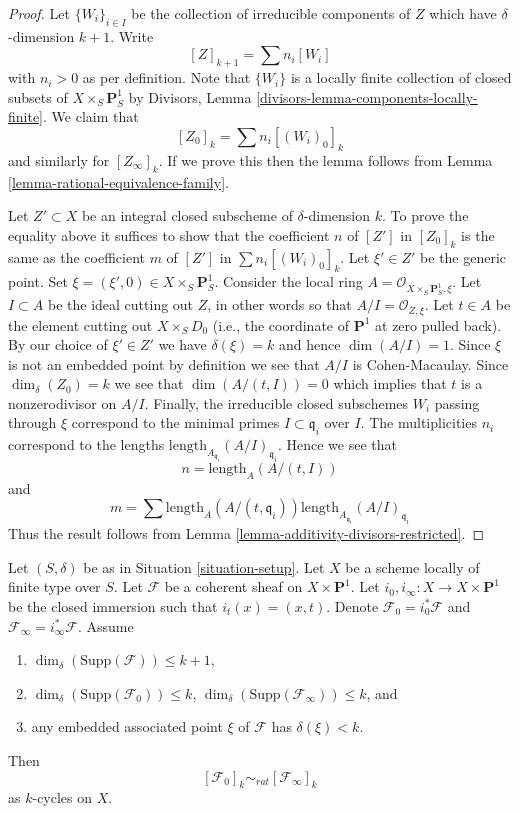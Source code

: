\begin{proof}
Let $\{W_i\}_{i \in I}$ be the collection of irreducible
components of $Z$ which have $\delta$-dimension $k + 1$.
Write
$$
[Z]_{k + 1} = \sum n_i[W_i]
$$
with $n_i > 0$ as per definition. Note that $\{W_i\}$
is a locally finite collection of closed subsets of
$X \times_S \mathbf{P}^1_S$ by
Divisors, Lemma \ref{divisors-lemma-components-locally-finite}.
We claim that
$$
[Z_0]_k = \sum n_i[(W_i)_0]_k
$$
and similarly for $[Z_\infty]_k$. If we prove this then the lemma
follows from Lemma \ref{lemma-rational-equivalence-family}.

\medskip\noindent
Let $Z' \subset X$ be an integral closed subscheme of $\delta$-dimension $k$.
To prove the equality above it suffices to show that the coefficient $n$
of $[Z']$ in $[Z_0]_k$ is the same as the coefficient $m$ of
$[Z']$ in $\sum n_i[(W_i)_0]_k$. Let $\xi' \in Z'$ be the generic point.
Set $\xi = (\xi', 0) \in  X \times_S \mathbf{P}^1_S$.
Consider the local ring $A = \mathcal{O}_{X \times_S \mathbf{P}^1_S, \xi}$.
Let $I \subset A$ be the ideal cutting out $Z$, in other words so that
$A/I = \mathcal{O}_{Z, \xi}$. Let $t \in A$ be the element cutting
out $X \times_S D_0$ (i.e., the coordinate of $\mathbf{P}^1$ at zero
pulled back). By our choice of $\xi' \in Z'$ we have $\delta(\xi) = k$
and hence $\dim(A/I) = 1$. Since $\xi$ is not an embedded point by
definition we see that $A/I$ is Cohen-Macaulay. Since $\dim_\delta(Z_0)
= k$ we see that $\dim(A/(t, I)) = 0$ which implies that $t$
is a nonzerodivisor on $A/I$. Finally, the irreducible closed subschemes
$W_i$ passing through $\xi$ correspond to the minimal primes
$I \subset \mathfrak q_i$ over $I$. The multiplicities $n_i$ correspond
to the lengths $\text{length}_{A_{\mathfrak q_i}}(A/I)_{\mathfrak q_i}$.
Hence we see that
$$
n = \text{length}_A(A/(t, I))
$$
and
$$
m = \sum
\text{length}_A(A/(t, \mathfrak q_i))
\text{length}_{A_{\mathfrak q_i}}(A/I)_{\mathfrak q_i}
$$
Thus the result follows from
Lemma \ref{lemma-additivity-divisors-restricted}.
\end{proof}

\begin{lemma}
\label{lemma-coherent-sheaf-cross-p1}
Let $(S, \delta)$ be as in Situation \ref{situation-setup}.
Let $X$ be a scheme locally of finite type over $S$.
Let $\mathcal{F}$ be a coherent sheaf on $X \times \mathbf{P}^1$.
Let $i_0, i_\infty : X \to X \times \mathbf{P}^1$ be the closed immersion
such that $i_t(x) = (x, t)$. Denote $\mathcal{F}_0 = i_0^*\mathcal{F}$ and
$\mathcal{F}_\infty = i_\infty^*\mathcal{F}$.
Assume
\begin{enumerate}
\item $\dim_\delta(\text{Supp}(\mathcal{F})) \leq k + 1$,
\item $\dim_\delta(\text{Supp}(\mathcal{F}_0)) \leq k$,
$\dim_\delta(\text{Supp}(\mathcal{F}_\infty)) \leq k$, and
\item any embedded associated point $\xi$ of $\mathcal{F}$ has
$\delta(\xi) < k$.
\end{enumerate}
Then
$$
[\mathcal{F}_0]_k \sim_{rat} [\mathcal{F}_\infty]_k
$$
as $k$-cycles on $X$.
\end{lemma}

